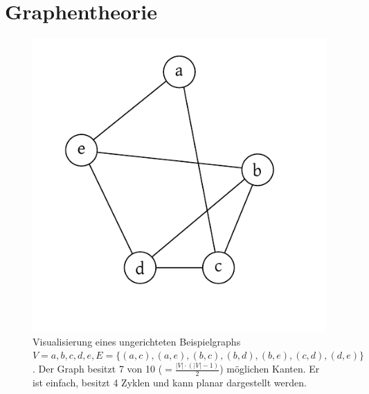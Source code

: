 \chapter{Graphentheorie}
%
\begin{figure}[p]
 \begin{center}
  \includegraphics{img/example_graph.pdf}
  \caption{
      Visualisierung eines ungerichteten Beispielgraphs $V = {a, b, c, d, e},
      E = \{(a, c), (a, e), (b, c), (b, d), (b, e), (c, d), (d, e)\}$.
      Der Graph besitzt 7 von 10 ($= \frac{|V| \cdot (|V|-1)}{2}$) möglichen Kanten.
      Er ist einfach, besitzt 4 Zyklen und kann planar dargestellt werden.
  }
  \label{fig:example_graph}
 \end{center}
\end{figure}

